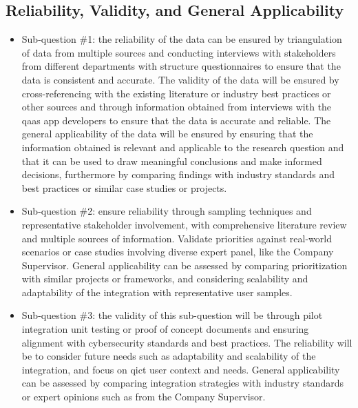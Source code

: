 \begin{multicols}{2}
  \subsection{Reliability, Validity, and General Applicability}
  \begin{itemize}[label=-]
    \item Sub-question \#1: the reliability of the data can be ensured by triangulation of data from
          multiple sources and conducting interviews with stakeholders from different departments with
          structure questionnaires to ensure that the data is consistent and accurate. The validity of
          the data will be ensured by  cross-referencing with the existing literature or industry best
          practices or other sources and  through information obtained from  interviews with the
          \acrshort{qaas} app developers to ensure  that the data is accurate and reliable. The general
          applicability of the data will be ensured by  ensuring that the information obtained is relevant
          and applicable to the research question and  that it can be used to draw meaningful conclusions
          and make informed decisions, furthermore by comparing findings with industry standards and best
          practices or similar case studies or projects.
    \item Sub-question \#2: ensure reliability through sampling techniques and representative stakeholder
          involvement, with comprehensive literature review and multiple sources of information. Validate
          priorities against real-world scenarios or case studies involving diverse expert panel, like
          the Company Supervisor. General applicability can be assessed by comparing prioritization with
          similar projects or frameworks, and considering scalability and adaptability of the integration
          with representative user samples.
    \item Sub-question \#3: the validity of this sub-question will be through pilot integration unit testing
          or proof of concept documents and ensuring alignment with cybersecurity standards and best
          practices. The reliability will be to consider future needs such as adaptability and scalability of
          the integration, and focus on \acrshort{qict} user context and needs. General applicability can be
          assessed by comparing integration strategies with industry standards or expert opinions such as from
          the Company Supervisor.
  \end{itemize}

\end{multicols}
